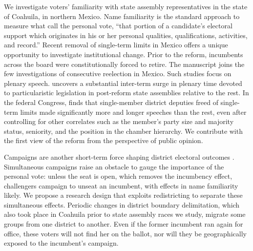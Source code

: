 \documentclass[letter,12pt]{article}
\begin{document}

We investigate voters' familiarity with state assembly representatives in the state of Coahuila, in northern Mexico. Name familiarity is the standard approach to measure what \citet[][:9]{cain.etal.1987} call the personal vote, ``that portion of a candidate's electoral support which originates in his or her personal qualities, qualifications, activities, and record.'' Recent removal of single-term limits in Mexico offers a unique opportunity to investigate institutional change. Prior to the reform, incumbents across the board were constitutionally forced to retire. The manuscript joins the few investigations of consecutive reelection in Mexico. Such studies focus on plenary speech. \citet{motolinia-reel-pork2021} uncovers a substantial inter-term surge in plenary time devoted to particularistic legislation in post-reform state assemblies relative to the rest. In the federal Congress, \citet{magar.debate.2021} finds that single-member district deputies freed of single-term limits made significantly more and longer speeches than the rest, even after controlling for other correlates such as the member's party size and majority status, seniority, and the position in the chamber hierarchy. We contribute with the first view of the reform from the perspective of public opinion.

Campaigns are another short-term force shaping district electoral outcomes \citep{downs.1957,jacobson.1990spending,popkin.1991}. Simultaneous campaigns raise an obstacle to gauge the importance of the personal vote: unless the seat is open, which removes the incumbency effect, challengers campaign to unseat an incumbent, with effects in name familiarity likely. We propose a research design that exploits redistricting to separate these simultaneous effects. Periodic changes in district boundary delimitation, which also took place in Coahuila prior to state assembly races we study, migrate some groups from one district to another. Even if the former incumbent ran again for office, these voters will not find her on the ballot, nor will they be geographically exposed to the incumbent's campaign.

\end{document}
